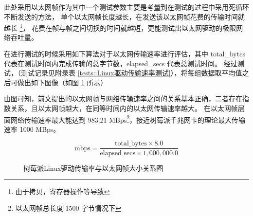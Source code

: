     此处采用以太网帧作为其中一个测试参数主要是考量到在测试的过程中采用死循环不断发送的方法，
    单个以太网帧长度越长，在发送该以太网帧花费的传输时间就越长
    \footnote{由于拷贝，寄存器操作等导致}，
    花费在帧与帧之间切换的时间就越短，更能测试出以太网驱动的极限网络吞吐量。

    在进行测试的时候采用如下算法对于以太网传输速率进行评估，其中 total\_bytes 代表在测试时间内完成传输的总字节数，elapsed\_secs 代表总测试时间。
    经过测试，（测试记录见附录表 \ref{tests::Linux驱动传输速率测试}），将每组数据取平均值之后可做出如下图像（如图 \ref{tests::Linux网卡驱动传输率与以太网帧大小} 所示）

    由图可知，前文提出的以太网帧与网络传输速率之间的关系基本正确，二者存在指数关系，且以太网帧越大，在同等时间内的以太网传输速率越大。
    在以太网帧层面网络传输速率最大能达到 983.21 MBps\footnote{以太网帧总长度 1500 字节情况下}，接近树莓派千兆网卡的理论最大传输速率 1000 MBps。

    $$\text{mbps} = \frac{\text{total\_bytes} \times 8.0}{\text{elapsed\_secs} \times 1,000,000.0}$$

    \begin{figure}[ht]
    \caption{树莓派Linux驱动传输率与以太网帧大小关系图}    \label{tests::Linux网卡驱动传输率与以太网帧大小}
    \end{figure}

